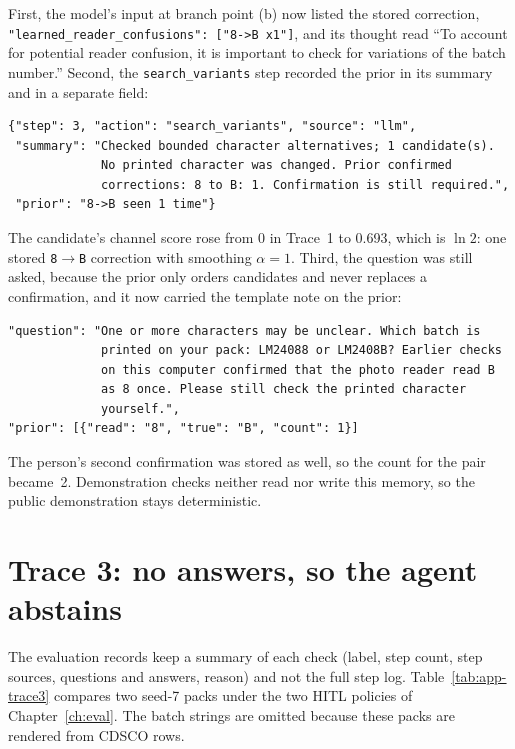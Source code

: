 First, the model's input at branch point (b) now listed the stored correction, \texttt{"learned\_reader\_confusions": ["8->B x1"]}, and its thought read ``To account for potential reader confusion, it is important to check for variations of the batch number.'' Second, the \texttt{search\_variants} step recorded the prior in its summary and in a separate field:
\begin{lstlisting}[language={},numbers=none,caption={Learned prior in the variant-search step of Trace~2 (\texttt{docs/trace/run2\_trace.jsonl})},label={lst:app-trace-run2}]
{"step": 3, "action": "search_variants", "source": "llm",
 "summary": "Checked bounded character alternatives; 1 candidate(s).
             No printed character was changed. Prior confirmed
             corrections: 8 to B: 1. Confirmation is still required.",
 "prior": "8->B seen 1 time"}
\end{lstlisting}
The candidate's channel score rose from 0 in Trace~1 to 0.693, which is $\ln 2$: one stored \texttt{8}$\to$\texttt{B} correction with smoothing $\alpha = 1$. Third, the question was still asked, because the prior only orders candidates and never replaces a confirmation, and it now carried the template note on the prior:
\begin{lstlisting}[language={},numbers=none]
"question": "One or more characters may be unclear. Which batch is
             printed on your pack: LM24088 or LM2408B? Earlier checks
             on this computer confirmed that the photo reader read B
             as 8 once. Please still check the printed character
             yourself.",
"prior": [{"read": "8", "true": "B", "count": 1}]
\end{lstlisting}
The person's second confirmation was stored as well, so the count for the pair became~2. Demonstration checks neither read nor write this memory, so the public demonstration stays deterministic.

\section{Trace 3: no answers, so the agent abstains}
\label{sec:app-traces-abstain}

The evaluation records keep a summary of each check (label, step count, step sources, questions and answers, reason) and not the full step log. Table~\ref{tab:app-trace3} compares two seed-7 packs under the two HITL policies of Chapter~\ref{ch:eval}. The batch strings are omitted because these packs are rendered from CDSCO rows.

